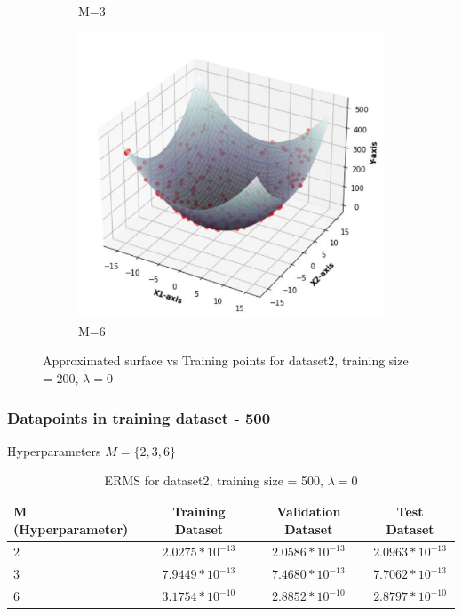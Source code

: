 \documentclass[11pt]{article}
\begin{document}
\begin{figure}[h]
\begin{subfigure}[b]{0.4\textwidth}
	\caption{    M=3}
	\label{fig:fig2.1.3.2}
	\end{subfigure}
	\hfill
	\begin{subfigure}[b]{0.4\textwidth}
	\centering
	\includegraphics[scale=0.5]{dataset2_200_lambda0_m6funcplot.jpg}
	\caption{    M=6}
	\label{fig:fig2.1.3.3}
	\end{subfigure}
\caption{Approximated surface vs Training points for dataset2, training size = 200, $\lambda = 0$}
\label{fig:fig2.1.3}
\end{figure}
\newpage

\subsubsection{Datapoints in training dataset - 500}
Hyperparameters $M = \{2,3,6\}$
\begin{table}[h]
\label{tab:tab2.1.3}
\begin{center}
\begin{tabular}{|l|c|c|c|}
\hline
\textbf{M (Hyperparameter)} & \textbf{Training Dataset} & \textbf{Validation Dataset} &\textbf{Test Dataset}\\
\hline
$2$ & $2.0275*10^{-13}$ & $2.0586*10^{-13}$ & $2.0963*10^{-13}$\\
\hline
$3$ & $7.9449*10^{-13}$ & $7.4680*10^{-13}$ & $7.7062*10^{-13}$\\
\hline
$6$ & $3.1754*10^{-10}$ & $2.8852*10^{-10}$ & $2.8797*10^{-10}$\\
\hline
\end{tabular}
\caption{ERMS for dataset2, training size = 500, $\lambda = 0$}
\end{center}
\end{table}
\end{document}
